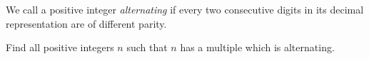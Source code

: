 We call a positive integer \emph{alternating} if every two consecutive digits in its decimal representation are of different parity.

Find all positive integers $n$ such that $n$ has a multiple which is alternating.

